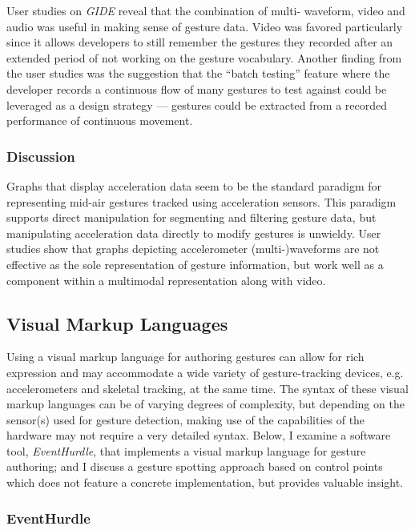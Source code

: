 User studies on \emph{GIDE} reveal that the combination of multi- waveform, video and audio was useful in making sense of gesture data. Video was favored particularly since it allows developers to still remember the gestures they recorded after an extended period of not working on the gesture vocabulary. Another finding from the user studies was the suggestion that the “batch testing” feature where the developer records a continuous flow of many gestures to test against could be leveraged as a design strategy --- gestures could be extracted from a recorded performance of continuous movement.

\subsubsection{Discussion}

Graphs that display acceleration data seem to be the standard paradigm for representing mid-air gestures tracked using acceleration sensors. This paradigm supports direct manipulation for segmenting and filtering gesture data, but manipulating acceleration data directly to modify gestures is unwieldy. User studies show that graphs depicting accelerometer (multi-)waveforms are not effective as the sole representation of gesture information, but work well as a component within a multimodal representation along with video.

\subsection{Visual Markup Languages}

Using a visual markup language for authoring gestures can allow for rich expression and may accommodate a wide variety of gesture-tracking devices, e.g. accelerometers and skeletal tracking, at the same time. The syntax of these visual markup languages can be of varying degrees of complexity, but depending on the sensor(s) used for gesture detection, making use of the capabilities of the hardware may not require a very detailed syntax. Below, I examine a software tool, \emph{EventHurdle}, that implements a visual markup language for gesture authoring; and I discuss a gesture spotting approach based on control points which does not feature a concrete implementation, but provides valuable insight.

\subsubsection{EventHurdle}

